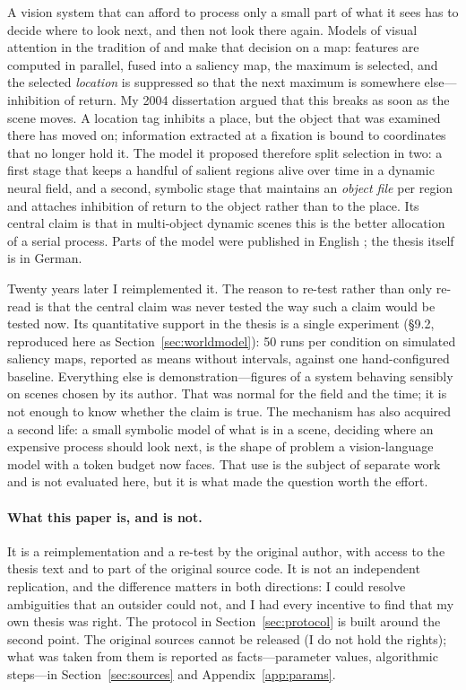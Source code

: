 \documentclass[11pt,a4paper]{article}
\begin{document}
A vision system that can afford to process only a small part of what it sees
has to decide where to look next, and then not look there again. Models of
visual attention in the tradition of \citet{koch1985} and \citet{itti1998} make
that decision on a map: features are computed in parallel, fused into a saliency
map, the maximum is selected, and the selected \emph{location} is suppressed so
that the next maximum is somewhere else---inhibition of return. My 2004
dissertation \citep{backer2004} argued that this breaks as soon as the scene
moves. A location tag inhibits a place, but the object that was examined there
has moved on; information extracted at a fixation is bound to coordinates that
no longer hold it. The model it proposed therefore split selection in two: a
first stage that keeps a handful of salient regions alive over time in a dynamic
neural field, and a second, symbolic stage that maintains an \emph{object file}
\citep{kahneman1992} per region and attaches inhibition of return to the object
rather than to the place. Its central claim is that in multi-object dynamic
scenes this is the better allocation of a serial process. Parts of the model
were published in English \citep{backer2001,backer2003}; the thesis itself is in
German.

Twenty years later I reimplemented it. The reason to re-test rather than only
re-read is that the central claim was never tested the way such a claim would be
tested now. Its quantitative support in the thesis is a single experiment
(\S9.2, reproduced here as Section~\ref{sec:worldmodel}): 50 runs per condition
on simulated saliency maps, reported as means without intervals, against one
hand-configured baseline. Everything else is demonstration---figures of a system
behaving sensibly on scenes chosen by its author. That was normal for the field
and the time; it is not enough to know whether the claim is true. The mechanism
has also acquired a second life: a small symbolic model of what is in a scene,
deciding where an expensive process should look next, is the shape of problem a
vision-language model with a token budget now faces. That use is the subject of
separate work and is not evaluated here, but it is what made the question worth
the effort.

\paragraph{What this paper is, and is not.} It is a reimplementation and a
re-test by the original author, with access to the thesis text and to part of the
original source code. It is not an independent replication, and the difference
matters in both directions: I could resolve ambiguities that an outsider could
not, and I had every incentive to find that my own thesis was right. The
protocol in Section~\ref{sec:protocol} is built around the second point. The
original sources cannot be released (I do not hold the rights); what was taken
from them is reported as facts---parameter values, algorithmic steps---in
Section~\ref{sec:sources} and Appendix~\ref{app:params}.
\end{document}
